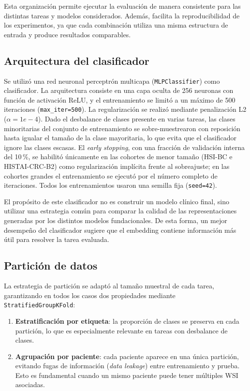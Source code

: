 Esta organización permite ejecutar la evaluación de manera consistente para
las distintas tareas y modelos considerados. Además, facilita la
reproducibilidad de los experimentos, ya que cada combinación utiliza una
misma estructura de entrada y produce resultados comparables.

\subsection{Arquitectura del clasificador}
\label{sec:arquitectura_clasificador}

Se utilizó una red neuronal perceptrón multicapa (\texttt{MLPClassifier}) como clasificador. La arquitectura consiste en una capa oculta de 256 neuronas con función de activación ReLU, y el entrenamiento se limitó a un máximo de 500 iteraciones (\texttt{max\_iter=500}). La regularización se realizó mediante penalización L2 (\texttt{$\alpha=1e-4$}). Dado el desbalance de clases presente en varias tareas, las clases minoritarias del conjunto de entrenamiento se sobre-muestrearon con reposición hasta igualar el tamaño de la clase mayoritaria, lo que evita que el clasificador ignore las clases escasas. El \textit{early stopping}, con una fracción de validación interna del 10\,\%, se habilitó únicamente en las cohortes de menor tamaño (HSI-BC e HISTAI-CRC-B2) como regularización implícita frente al sobreajuste; en las cohortes grandes el entrenamiento se ejecutó por el número completo de iteraciones. Todos los entrenamientos usaron una semilla fija (\texttt{seed=42}).

El propósito de este clasificador no es construir un modelo clínico final,
sino utilizar una estrategia común para comparar la calidad de las
representaciones generadas por los distintos modelos fundacionales. De esta
forma, un mejor desempeño del clasificador sugiere que el embedding contiene
información más útil para resolver la tarea evaluada.

\subsection{Partición de datos}
\label{sec:particion_datos}

La estrategia de partición se adaptó al tamaño muestral de cada tarea, garantizando en todos los casos dos propiedades mediante \texttt{StratifiedGroupKFold}:

\begin{enumerate}
    \item \textbf{Estratificación por etiqueta}: la proporción de clases se preserva en cada partición, lo que es especialmente relevante en tareas con desbalance de clases.
    \item \textbf{Agrupación por paciente}: cada paciente aparece en una única partición, evitando fugas de información (\textit{data leakage}) entre entrenamiento y prueba. Esto es fundamental cuando un mismo paciente puede tener múltiples WSI asociadas.
\end{enumerate}

